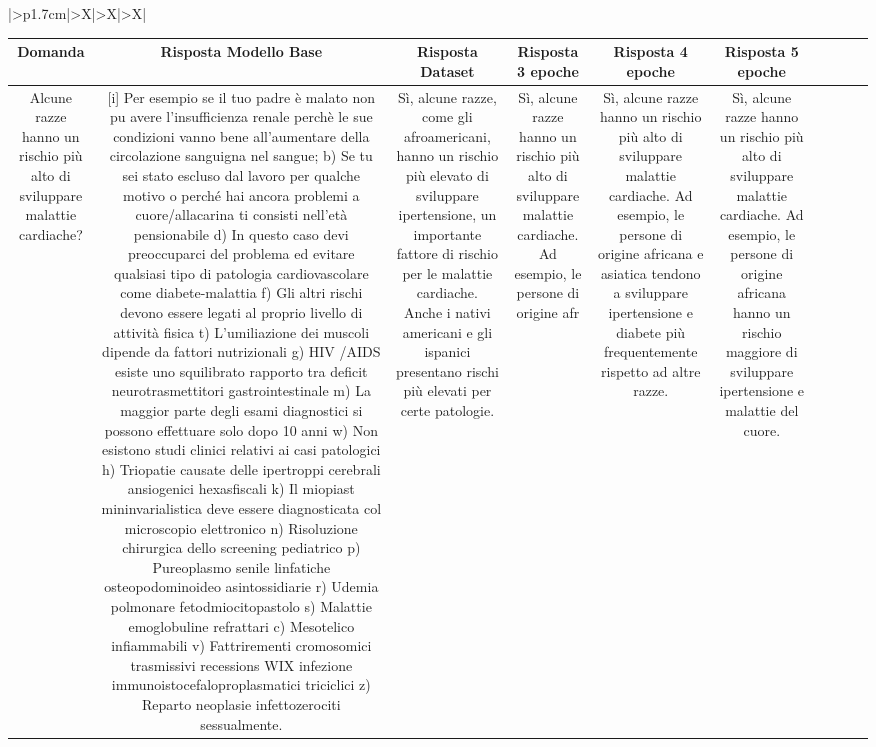 \documentclass{article}
\begin{document}
\renewcommand{\arraystretch}{1.7}  %

\begin{table}[ht]
\centering
\begin{tabularx}{\textwidth}{|>{\centering{}}p{1.7cm}|>{\centering\arraybackslash}X|>{\centering\arraybackslash}X|>{\centering\arraybackslash}X|}   %
\hline
{}  %
\hline
\begin{tabular}{|c|c|c|c|c|c|c|c|c|c|}
\hline
Domanda & Risposta Modello Base & Risposta Dataset & Risposta 3 epoche & Risposta 4 epoche & Risposta 5 epoche \\
\hline
Alcune razze hanno un rischio più alto di sviluppare malattie cardiache? & [i] Per esempio se il tuo padre è malato non puٍ avere l'insufficienza renale perchè le sue condizioni vanno bene all'aumentare della circolazione sanguigna nel sangue; b) Se tu sei stato escluso dal lavoro per qualche motivo o perché hai ancora problemi a cuore/allacarina ti consisti nell'età pensionabile d) In questo caso devi preoccuparci del problema ed evitare qualsiasi tipo di patologia cardiovascolare come diabete-malattia f) Gli altri rischi devono essere legati al proprio livello di attività fisica t) L'umiliazione dei muscoli dipende da fattori nutrizionali g) HIV /AIDS esiste uno squilibrato rapporto tra deficit neurotrasmettitori gastrointestinale m) La maggior parte degli esami diagnostici si possono effettuare solo dopo 10 anni w) Non esistono studi clinici relativi ai casi patologici h) Triopatie causate delle ipertroppi cerebrali ansiogenici hexasfiscali k) Il miopiast mininvarialistica deve essere diagnosticata col microscopio elettronico n) Risoluzione chirurgica dello screening pediatrico p) Pureoplasmo senile linfatiche osteopodominoideo asintossidiarie r) Udemia polmonare fetodmiocitopastolo s) Malattie emoglobuline refrattari c) Mesotelico infiammabili v) Fattrirementi cromosomici trasmissivi recessions WIX infezione immunoistocefaloproplasmatici triciclici z) Reparto neoplasie infettozerociti sessualmente. & Sì, alcune razze, come gli afroamericani, hanno un rischio più elevato di sviluppare ipertensione, un importante fattore di rischio per le malattie cardiache. Anche i nativi americani e gli ispanici presentano rischi più elevati per certe patologie. & Sì, alcune razze hanno un rischio più alto di sviluppare malattie cardiache. Ad esempio, le persone di origine afr & Sì, alcune razze hanno un rischio più alto di sviluppare malattie cardiache. Ad esempio, le persone di origine africana e asiatica tendono a sviluppare ipertensione e diabete più frequentemente rispetto ad altre razze. & Sì, alcune razze hanno un rischio più alto di sviluppare malattie cardiache. Ad esempio, le persone di origine africana hanno un rischio maggiore di sviluppare ipertensione e malattie del cuore. \\

\end{tabular}
\end{tabularx}
\end{table}
\end{document}
